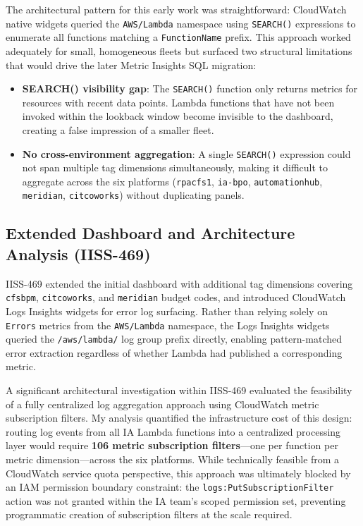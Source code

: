 The architectural pattern for this early work was straightforward:
CloudWatch native widgets queried the \texttt{AWS/Lambda} namespace using
\texttt{SEARCH()} expressions to enumerate all functions matching a
\texttt{FunctionName} prefix. This approach worked adequately for small,
homogeneous fleets but surfaced two structural limitations that would
drive the later Metric Insights SQL migration:

\begin{itemize}
    \item \textbf{SEARCH() visibility gap}: The \texttt{SEARCH()} function
          only returns metrics for resources with recent data points.
          Lambda functions that have not been invoked within the lookback
          window become invisible to the dashboard, creating a false
          impression of a smaller fleet.

    \item \textbf{No cross-environment aggregation}: A single
          \texttt{SEARCH()} expression could not span multiple tag
          dimensions simultaneously, making it difficult to aggregate
          across the six platforms (\texttt{rpacfs1},
          \texttt{ia-bpo}, \texttt{automationhub}, \texttt{meridian},
          \texttt{citcoworks}) without duplicating panels.
\end{itemize}

\subsection{Extended Dashboard and Architecture Analysis (IISS-469)}

IISS-469 extended the initial dashboard with additional tag dimensions
covering \texttt{cfsbpm}, \texttt{citcoworks}, and \texttt{meridian}
budget codes, and introduced CloudWatch Logs Insights widgets for error
log surfacing. Rather than relying solely on \texttt{Errors} metrics from
the \texttt{AWS/Lambda} namespace, the Logs Insights widgets queried the
\texttt{/aws/lambda/} log group prefix directly, enabling pattern-matched
error extraction regardless of whether Lambda had published a
corresponding metric.

A significant architectural investigation within IISS-469 evaluated the
feasibility of a fully centralized log aggregation approach using
CloudWatch metric subscription filters. My analysis quantified the
infrastructure cost of this design: routing log events from all IA Lambda
functions into a centralized processing layer would require \textbf{106
metric subscription filters}---one per function per metric
dimension---across the six platforms. While technically
feasible from a CloudWatch service quota perspective, this approach was
ultimately blocked by an IAM permission boundary constraint:
the \texttt{logs:PutSubscriptionFilter} action was not granted within the
IA team's scoped permission set, preventing programmatic creation of
subscription filters at the scale required.


